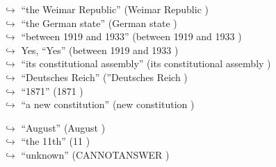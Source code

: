 \documentclass[11pt,a4paper, onecolumn]{article}
\begin{document}
\begin{figure}[t] \small \begin{tcolorbox}[boxsep=0pt,left=5pt,right=0pt,top=2pt,colback = yellow!5] \begin{dialogue}
 \small 
\colorbox{pink!25}{$\hookrightarrow$}
{ ``the Weimar Republic'' (Weimar Republic ) }
\\
\colorbox{pink!25}{$\hookrightarrow$}
{ ``the German state'' (German state ) }
\\
\colorbox{pink!25}{$\hookrightarrow$}
{ ``between 1919 and 1933'' (between 1919 and 1933 ) }
\\
\colorbox{pink!25}{$\hookrightarrow$}
\colorbox{red!25}{Yes,}
{ ``Yes'' (between 1919 and 1933 ) }
\\
\colorbox{pink!25}{$\hookrightarrow$}
{ ``its constitutional assembly'' (its constitutional assembly ) }
\\
\colorbox{pink!25}{$\hookrightarrow$}
{ ``Deutsches Reich'' (''Deutsches Reich ) }
\\
\colorbox{pink!25}{$\hookrightarrow$}
{ ``1871'' (1871 ) }
\\
\colorbox{pink!25}{$\hookrightarrow$}
{ ``a new constitution'' (new constitution ) }
 \end{dialogue}\end{tcolorbox}\end{figure}\begin{figure}[t] \small \begin{tcolorbox}[boxsep=0pt,left=5pt,right=0pt,top=2pt,colback = yellow!5] \begin{dialogue}
 \small 
\colorbox{pink!25}{$\hookrightarrow$}
{ ``August'' (August ) }
\\
\colorbox{pink!25}{$\hookrightarrow$}
{ ``the 11th'' (11 ) }
\\
\colorbox{pink!25}{$\hookrightarrow$}
{ ``unknown'' (CANNOTANSWER ) }
\\
 \end{dialogue}\end{tcolorbox}\end{figure}
\end{document}
